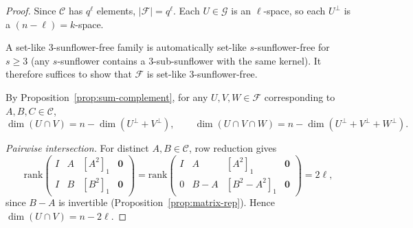 \documentclass[11pt]{article}
\theoremstyle{definition}
\begin{document}
\begin{proof}
Since $\mathcal{C}$ has $q^\ell$ elements, $|\mathcal{F}| = q^\ell$. Each $U \in \mathcal{G}$ is an $\ell$-space, so each $U^\perp$ is a $(n-\ell) = k$-space.

A set-like $3$-sunflower-free family is automatically set-like $s$-sunflower-free for $s \geq 3$ (any $s$-sunflower contains a $3$-sub-sunflower with the same kernel). It therefore suffices to show that $\mathcal{F}$ is set-like $3$-sunflower-free.

By Proposition~\ref{prop:sum-complement}, for any $U, V, W \in \mathcal{F}$ corresponding to $A, B, C \in \mathcal{C}$,
\[
\dim(U \cap V) = n - \dim(U^\perp + V^\perp), \qquad \dim(U \cap V \cap W) = n - \dim(U^\perp + V^\perp + W^\perp).
\]

\textit{Pairwise intersection.} For distinct $A, B \in \mathcal{C}$, row reduction gives
\[
\mathrm{rank}\begin{pmatrix} I & A & [A^2]_1 & \mathbf{0} \\ I & B & [B^2]_1 & \mathbf{0} \end{pmatrix}
= \mathrm{rank}\begin{pmatrix} I & A & [A^2]_1 & \mathbf{0} \\ 0 & B - A & [B^2 - A^2]_1 & \mathbf{0} \end{pmatrix}
= 2\ell,
\]
since $B - A$ is invertible (Proposition~\ref{prop:matrix-rep}). Hence $\dim(U \cap V) = n - 2\ell$.


\end{proof}
\end{document}
